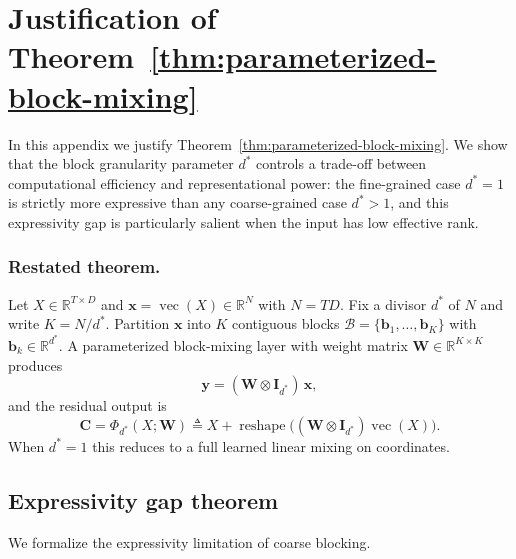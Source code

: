 \documentclass[sigconf,screen]{acmart}
\begin{document}
\section{Justification of Theorem~\ref{thm:parameterized-block-mixing}}
\label{app:thm:parameterized-block-mixing}

In this appendix we justify Theorem~\ref{thm:parameterized-block-mixing}. We show that the block granularity parameter \(d^{\ast}\) controls a trade-off between computational efficiency and representational power: the fine-grained case \(d^{\ast}=1\) is strictly more expressive than any coarse-grained case \(d^{\ast}>1\), and this expressivity gap is particularly salient when the input has low effective rank.

\subsubsection*{\bf Restated theorem.} 
Let \(X\in\mathbb R^{T\times D}\) and \(\mathbf x=\operatorname{vec}(X)\in\mathbb R^N\) with \(N=TD\). Fix a divisor \(d^{\ast}\) of \(N\) and write \(K=N/d^{\ast}\).  Partition \(\mathbf x\) into \(K\) contiguous blocks \(\mathcal B=\{\mathbf b_1,\dots,\mathbf b_K\}\) with \(\mathbf b_k\in\mathbb R^{d^{\ast}}\).  A parameterized block-mixing layer with weight matrix \(\mathbf W\in\mathbb R^{K\times K}\) produces
\[
\mathbf y = (\mathbf W \otimes \mathbf I_{d^{\ast}})\,\mathbf x,
\]
and the residual output is
\[
\mathbf C = \Phi_{d^{\ast}}(X;\mathbf W)
\triangleq X + \operatorname{reshape}\bigl((\mathbf W\otimes\mathbf I_{d^{\ast}})\operatorname{vec}(X)\bigr).
\]
When \(d^{\ast}=1\) this reduces to a full learned linear mixing on coordinates.

\subsection{Expressivity gap theorem}

We formalize the expressivity limitation of coarse blocking.
\end{document}
